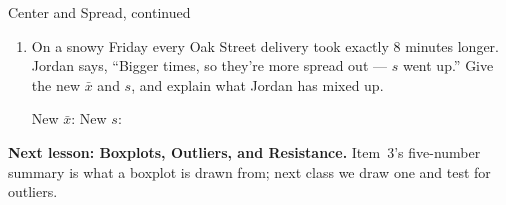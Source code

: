\documentclass[12pt]{article}
\begin{document}
\begin{notesbox}{Center and Spread, continued}
\begin{enumerate}[leftmargin=1.6em, itemsep=5pt, topsep=2pt, start=4]
        \par\vspace{3pt}
        \textbf{(a)} Oak Street and Main Street have the same mean. Whose delivery times are
        more predictable? Explain.
        \gradedresponse{\gradedblank[id=q5a, type=rubric, points=1, display={Oak Street: about 4 min from the mean, not 11 --- less spread.}]{\linewidth}{2in}}

        \textbf{(b)} Hilltop's deliveries take 15 minutes longer on average. Are Hilltop's
        times more spread out than Oak Street's? Explain.
        \gradedresponse{\gradedblank[id=q5b, type=rubric, points=1, display={No --- both have $s = 4$. Hilltop is slower, not more spread out.}]{\linewidth}{2in}}

  \item On a snowy Friday every Oak Street delivery took exactly $8$ minutes longer. Jordan
        says, ``Bigger times, so they're more spread out --- $s$ went up.'' Give the new
        $\bar{x}$ and $s$, and explain what Jordan has mixed up.

        \par\vspace{4pt}
        New $\bar{x}$: \blankbox{\gradedblank[id=q6a, type=short, points=0.5, answer={38}, check=numeric, display={38 minutes}]{3cm}{13.5pt}} \qquad New $s$: \blankbox{\gradedblank[id=q6b, type=short, points=0.5, answer={4}, check=numeric, display={4 minutes}]{3cm}{13.5pt}}
        \gradedresponse{\gradedblank[id=q6c, type=rubric, points=1, display={Every time moved up 8, so each deviation from the new mean is unchanged. Bigger times, same spread: $s$ is not about size.}]{\linewidth}{2in}}

\end{enumerate}
\end{notesbox}

\boxguard[5]   %
\begin{spiralbox}
\textbf{Next lesson: Boxplots, Outliers, and Resistance.} Item~3's five-number summary is what a
boxplot is drawn from; next class we draw one and test for outliers.
\end{spiralbox}
\end{document}
